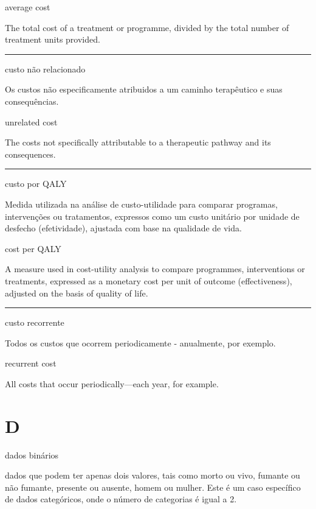 \documentclass[
]{book}
\begin{document}
average cost

The total cost of a treatment or programme, divided by the total number of treatment units provided.

\begin{center}\rule{0.5\linewidth}{0.5pt}\end{center}

custo não relacionado

Os custos não especificamente atribuidos a um caminho terapêutico e suas consequências.

unrelated cost

The costs not specifically attributable to a therapeutic pathway and its consequences.

\begin{center}\rule{0.5\linewidth}{0.5pt}\end{center}

custo por QALY

Medida utilizada na análise de custo-utilidade para comparar programas, intervenções ou tratamentos, expressos como um custo unitário por unidade de desfecho (efetividade), ajustada com base na qualidade de vida.

cost per QALY

A measure used in cost-utility analysis to compare programmes, interventions or treatments, expressed as a monetary cost per unit of outcome (effectiveness), adjusted on the basis of quality of life.

\begin{center}\rule{0.5\linewidth}{0.5pt}\end{center}

custo recorrente

Todos os custos que ocorrem periodicamente - anualmente, por exemplo.

recurrent cost

All costs that occur periodically---each year, for example.

\hypertarget{d}{%
\chapter*{D}\label{d}}

dados binários

dados que podem ter apenas dois valores, tais como morto ou vivo, fumante ou não fumante, presente ou ausente, homem ou mulher. Este é um caso específico de dados categóricos, onde o número de categorias é igual a 2.
\end{document}
